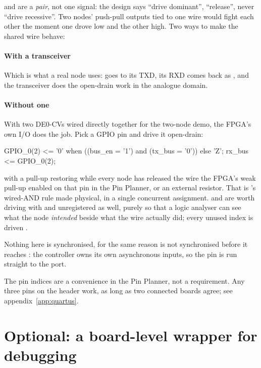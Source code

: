  and  are a \emph{pair}, not one signal: the design says ``drive
dominant'', ``release'', never ``drive recessive''. Two nodes' push-pull outputs tied to one wire
would fight each other the moment one drove low and the other high. Two ways to make the shared wire
behave:

\paragraph{With a transceiver}
Which is what a real node uses:  goes to its TXD, its RXD comes back as ,
and the transceiver does the open-drain work in the analogue domain.

\paragraph{Without one}
With two DE0-CVs wired directly together for the two-node demo, the FPGA's own I/O does the job. Pick
a GPIO pin and drive it open-drain:

\begin{vhdlcode}
GPIO_0(2) <= '0' when ((bus_en = '1') and (tx_bus = '0')) else 'Z';
rx_bus    <= GPIO_0(2);
\end{vhdlcode}

with a pull-up restoring  while every node has released the wire \textemdash{} the FPGA's
weak pull-up enabled on that pin in the Pin Planner, or an external resistor. That is
's wired-AND rule made physical, in a single concurrent assignment.
 and  are worth driving with  and 
unregistered as well, purely so that a logic analyser can see what the node \emph{intended} beside
what the wire actually did; every unused index is driven .

Nothing here is synchronised, for the same reason  is not synchronised before it reaches
: the controller owns its own asynchronous inputs, so the pin is run straight to
the  port.

The pin indices are a convenience in the Pin Planner, not a requirement. Any three pins on the header
work, as long as two connected boards agree; see appendix~\ref{app:quartus}.

\section{Optional: a board-level wrapper for debugging}
\label{c19:sec:wrapper}

